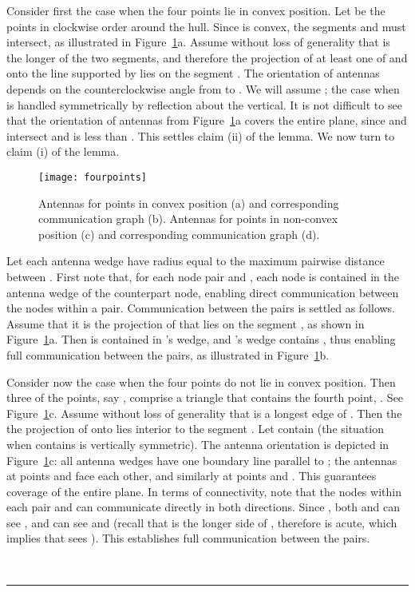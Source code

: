 \documentclass[11pt]{article}
\newcommand{\qed}{\rule{0.5em}{1.5ex}}
\newcommand{\fqed}{{\hfill~\qed}}
\newenvironment{proof}{{\noindent \bf Proof.}}
                      {{\hfill \fqed} \vspace{1em}}
\begin{document}
\begin{proof}
Consider first the case when the four points lie in convex
position. Let  be the points in clockwise order around
the hull. Since  is convex, the segments  and  must
intersect, as illustrated in Figure~\ref{fig:fourpoints}a.
Assume without loss of generality that  is the longer of the
two segments, and therefore the projection of at least one of 
and  onto the line supported by  lies on the segment .
The orientation of antennas depends on the counterclockwise
angle  from  to . We will assume ;
the case when  is handled
symmetrically by reflection about the vertical.
It is not difficult to see that the orientation of antennas
from Figure~\ref{fig:fourpoints}a covers the entire plane, since
 and  intersect and  is less than . This
settles claim (ii) of the lemma. We now turn to claim (i) of the lemma.

\begin{figure}[htpb]
\centering
\texttt{[image: fourpoints]}
\caption{ Antennas for points  in convex position (a) and corresponding communication graph (b).
Antennas for points  in non-convex position (c) and corresponding communication graph (d).}
\label{fig:fourpoints}
\end{figure}

Let each antenna wedge have radius equal to the maximum
pairwise distance between .
First note that, for each node pair  and , each
node is contained in the antenna wedge of the counterpart node,
enabling direct communication between the nodes within a pair.
Communication between the pairs is settled as follows. Assume
that it is the projection of  that lies on the segment
, as shown in Figure~\ref{fig:fourpoints}a.
Then  is contained in 's wedge, and 's wedge
contains , thus enabling full communication between the pairs, as
illustrated in Figure~\ref{fig:fourpoints}b.

Consider now the case when the four points do not lie
in convex position. Then three of the points, say , comprise a
triangle that contains the fourth point, . See Figure~\ref{fig:fourpoints}c.
Assume without loss of generality that  is a longest edge of
. Then the the projection  of  onto 
lies interior to the segment . Let  contain 
(the situation when  contains  is vertically
symmetric). The antenna orientation is depicted in
Figure~\ref{fig:fourpoints}c: all antenna wedges have one boundary line
parallel to ; the antennas at points  and  face each other,
and similarly at points  and . This guarantees coverage of the entire
plane. In terms of connectivity, note that the nodes within each pair
 and  can communicate directly in both directions.
Since , both  and  can see , and  can
see  and  (recall that  is the longer side of ,
therefore  is acute, which implies that  sees ).
This establishes full communication between the pairs.
\end{proof}
\end{document}
